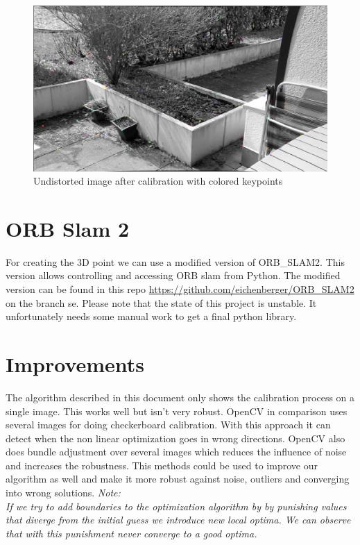 \documentclass[11pt,a4paper,titlepage,oneside]{report}
\begin{document}
\begin{figure}[H]
  \begin{center}
		\includegraphics[width=1.0\textwidth]{img/calib_output.png}
  \end{center}
	\caption{Undistorted image after calibration with colored keypoints}\label{fig:undistorted}
\end{figure}

\section{ORB Slam 2}
For creating the 3D point we can use a modified version of ORB\_SLAM2. This version allows controlling and accessing ORB slam from Python. The modified version can be found in this repo \url{https://github.com/eichenberger/ORB\_SLAM2} on the branch se. Please note that the state of this project is unstable. It unfortunately needs some manual work to get a final python library.

\section{Improvements}\label{sec:improvements}
The algorithm described in this document only shows the calibration process on a single image. This works well but isn't very robust. OpenCV in comparison uses several images for doing checkerboard calibration. With this approach it can detect when the non linear optimization goes in wrong directions. OpenCV also does bundle adjustment over several images which reduces the influence of noise and increases the robustness. This methods could be used to improve our algorithm as well and make it more robust against noise, outliers and converging into wrong solutions.
\em
Note:\\
If we try to add boundaries to the optimization algorithm by by punishing values that diverge from the initial guess we introduce new local optima. We can observe that with this punishment never converge to a good optima.
\normalfont
\end{document}
